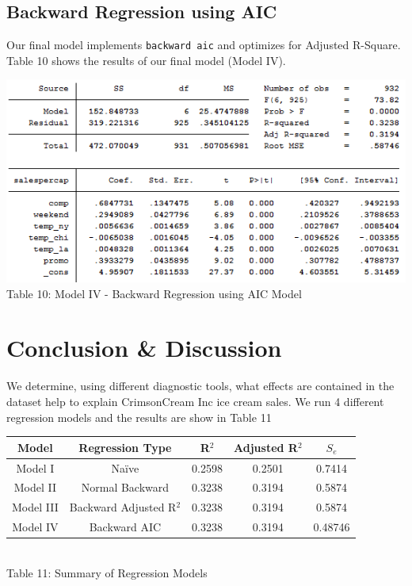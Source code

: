 \documentclass[10pt]{article}
\begin{document}
\subsection{Backward Regression using AIC}

Our final  model implements {\tt backward aic} and optimizes for Adjusted R-Square. Table 10 shows the results of our final model (Model IV). 

\begin{center}
\includegraphics[scale=0.8]{g22.png}\\
Table 10: Model IV - Backward Regression using AIC Model
\end{center}


\section{Conclusion \& Discussion}

We determine, using different diagnostic tools, what effects are contained in the dataset help to explain CrimsonCream Inc ice cream sales. We run 4 different regression models and the results are show in Table 11

\newpage

\begin{center}
\begin{tabular}{|c|c|c|c|c|}
\hline
{\bf Model} & {\bf Regression Type} & {\bf R$^2$} & {\bf Adjusted R$^2$} & {\bf $S_e$} \\
\hline
Model I & Na\"{i}ve &  0.2598 & 0.2501 & 0.7414\\
Model II & Normal Backward &0.3238 & 0.3194 & 0.5874 \\
Model III & Backward Adjusted R$^2$ & 0.3238 & 0.3194 & 0.5874 \\
Model IV & Backward AIC & 0.3238 & 0.3194 & 0.48746 \\
\hline
\end{tabular}\\
Table 11: Summary of Regression Models
\end{center}
\end{document}
